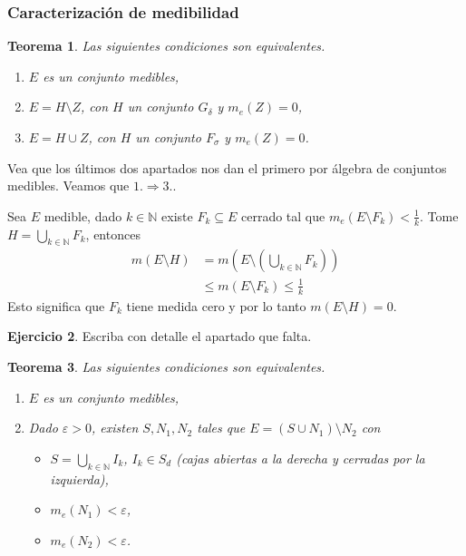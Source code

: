 \documentclass[12pt]{article}
\theoremstyle{plain}
\newtheorem{Th}{Teorema}[subsection]   %
\theoremstyle{definition}
\newtheorem{Ej}[Th]{Ejercicio}
\theoremstyle{remark}
\numberwithin{equation}{section}
\newcommand{\sg}{\sigma}            %
\newcommand{\bN}{\mathbb{N}}        %
\renewcommand{\leq}{\leqslant}      %
\renewcommand{\:}{\colon}           %
\begin{document}
\begin{multicols}{2}
\subsubsection*{Caracterización de medibilidad}

\begin{Th}\label{thm:medEsGDoFSmasomenosMedCero}
  Las siguientes condiciones son equivalentes.
  \begin{enumerate}
    \item $E$ es un conjunto medibles,
    \item $E=H\setminus Z$, con $H$ un conjunto $G_\delta$ y $m_e(Z)=0$,
    \item $E=H\cup Z$, con $H$ un conjunto $F_\sg$ y $m_e(Z)=0$.
  \end{enumerate}
\end{Th}

\begin{ptcbp}
Vea que los últimos dos apartados nos dan el primero por álgebra de conjuntos medibles. Veamos que $\mathit{1.}\Rightarrow\mathit{3.}$.\par
Sea $E$ medible, dado $k\in\bN$ existe $F_k\subseteq E$ cerrado tal que $m_e(E\setminus F_k)<\frac{1}{k}$. Tome $H=\bigcup_{k\in\bN}F_k$, entonces
\begin{align*}
  m(E\setminus H) &=m\left(E\setminus\left(\bigcup_{k\in\bN}F_k\right)\right)\\
  &\leq m(E\setminus F_k)\leq \frac{1}{k}
\end{align*}
Esto significa que $F_k$ tiene medida cero y por lo tanto $m(E\setminus H)=0$.
\end{ptcbp}

\begin{Ej}
  Escriba con detalle el apartado que falta.
\end{Ej}

\begin{Th}
  Las siguientes condiciones son equivalentes.
  \begin{enumerate}
    \item $E$ es un conjunto medibles,
    \item Dado $\varepsilon>0$, existen $S,N_1,N_2$ tales que $E=(S\cup N_1)\setminus N_2$ con
        \begin{itemize}
          \item $S=\bigcup_{k\in\bN}I_k$, $I_k\in S_d$ (cajas abiertas a la derecha y cerradas por la izquierda),
          \item $m_e(N_1)<\varepsilon$,
          \item $m_e(N_2)<\varepsilon$.
        \end{itemize}
  \end{enumerate}
\end{Th}


\end{multicols}
\end{document}

